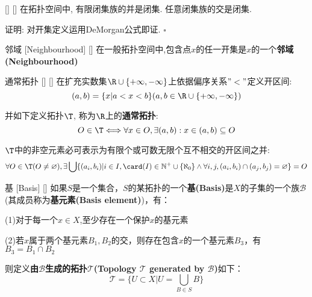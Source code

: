 \documentclass[UTF8]{ctexart}
\begin{document}
            \begin{thm}
                []
                {}
                []
                []
                在拓扑空间中, 有限闭集族的并是闭集. 任意闭集族的交是闭集. 
            \end{thm}

                证明: 对开集定义运用DeMorgan公式即证. $\square$

            \begin{dfn}
                []
                {邻域}
                [Neighbourhood]
                []
                在一般拓扑空间中,包含点\(x\)的任一开集是\(x\)的一个\textbf{邻域(Neighbourhood)}
            \end{dfn}

            \begin{xmp}
                []
                {通常拓扑}
                []
                []
                在扩充实数集$\R\cup\{+\infty,-\infty\}$上依据偏序关系$"<"$定义开区间: 
                \[(a,b)=\{x|a<x<b\}(a,b\in\R\cup\{+\infty,-\infty\})\]
                
                并如下定义拓扑$\T$, 称为$\R$上的\textbf{通常拓扑}: 
                \[O\in\T\Longleftrightarrow\forall x\in O, \exists(a,b): x\in(a,b)\subseteq O\]

                $\T$中的非空元素必可表示为有限个或可数无限个互不相交的开区间之并: 
                \[\forall O\in \T(O\neq \varnothing), \exists\bigcup\{(a_i,b_i)|i\in I, \card(I)\in\mathbb{N^+}\cup\{\aleph_0\}\wedge\forall i,j, (a_i,b_i)\cap(a_j,b_j)=\varnothing\}=O\]
            \end{xmp}

            \begin{dfn}
                []
                {基}
                [Basis]
                []
                如果$S$是一个集合，$S$的某拓扑的一个\textbf{基(Basis)}是$X$的子集的一个族$\mathcal{B}$(其成员称为\textbf{基元素(Basis element)})，有：

                (1)对于每一个$x\in X$,至少存在一个保护$x$的基元素

                (2)若$x$属于两个基元素$B_1,B_2$的交，则存在包含$x$的一个基元素$B_3$，有$B_3=B_1\cap B_2$

                则定义\textbf{由$\mathcal{B}$生成的拓扑$\mathcal{T}$(Topology $\mathcal{T}$ generated by $\mathcal{B}$)}如下：\[\mathcal{T}=\{U \subset X|U=\bigcup_{B\in S} B\}\]
            \end{dfn}
                
\end{document}
